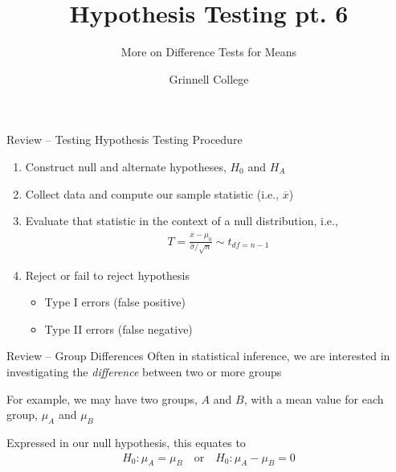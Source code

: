\documentclass{beamer}
\title[Introduction to Statistics]{Hypothesis Testing pt. 6}
\subtitle{More on Difference Tests for Means}
\author{Grinnell College}
\date{}
\begin{document}
\begin{frame}
  \titlepage
\end{frame}

\begin{frame}{Review -- Testing}
Hypothesis Testing Procedure
\begin{enumerate}
\item Construct null and alternate hypotheses, $H_0$ and $H_A$
\item Collect data and compute our sample statistic (i.e., $\overline{x}$)
\item Evaluate that statistic in the context of a null distribution, i.e., 
\begin{align*}
T = \frac{\overline{x} - \mu_0}{\hat{\sigma}/\sqrt{n}} \sim t_{df=n-1}
\end{align*}
\item Reject or fail to reject hypothesis
\begin{itemize}
\item Type I errors (false positive)
\item Type II errors (false negative)
\end{itemize}
\end{enumerate}
\end{frame}

\begin{frame}{Review -- Group Differences}
Often in statistical inference, we are interested in investigating the \textit{difference} between two or more groups \vspace{4mm}

For example, we may have two groups, $A$ and $B$, with a mean value for each group, $\mu_A$ and $\mu_B$ \\ \vspace{4mm}

Expressed in our null hypothesis, this equates to
\begin{align*}
H_0: \mu_A = \mu_B \quad \text{or} \quad H_0: \mu_A - \mu_B = 0
\end{align*}
\end{frame}
\end{document}
